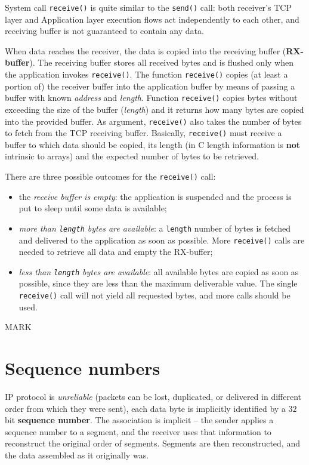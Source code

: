\documentclass[10pt]{book}
\begin{document}
System call \texttt{receive()} is quite similar to the \texttt{send()} call:
both receiver's TCP layer and Application layer execution flows act
independently to each other, and receiving buffer is not guaranteed to contain
any data.

When data reaches the receiver, the data is copied into the receiving buffer
(\textbf{RX-buffer}). The receiving buffer stores all received bytes and is flushed only
when the application invokes \texttt{receive()}. The function
\texttt{receive()} copies (at least a portion of) the receiver buffer into the
application buffer by means of passing a buffer with known \emph{address} and
\emph{length}. Function \texttt{receive()} copies bytes without exceeding the size of
the buffer (\emph{length}) and it returns how many bytes are copied into the
provided buffer. As argument, \texttt{receive()} also takes the number of bytes
to fetch from the TCP receiving buffer. Basically, \texttt{receive()} must
receive a buffer to which data should be copied, its length (in C length
information is \textbf{not} intrinsic to arrays) and the expected number of
bytes to be retrieved.

There are three possible outcomes for the \texttt{receive()} call:

\begin{itemize}
    \item the \emph{receive buffer is empty}: the application is suspended and
		the process is put to sleep until some data is available;
    \item \emph{more than \texttt{length} bytes are available}: a
        \texttt{length} number of bytes is fetched and delivered to the
        application as soon as possible. More \texttt{receive()} calls are
        needed to retrieve all data and empty the RX-buffer;
    \item \emph{less than \texttt{length} bytes are available}: all available
        bytes are copied as soon as possible, since they are less than the
        maximum deliverable value. The single \texttt{receive()} call will not
        yield all requested bytes, and more calls should be used.
\end{itemize}

MARK
\section{Sequence numbers}

IP protocol is \emph{unreliable} (packets can be lost, duplicated, or delivered
in different order from which they were sent), each data byte is implicitly
identified by a $32$ bit \textbf{sequence number}. The association is implicit
\--- the sender applies a sequence number to a segment, and the receiver uses
that information to reconstruct the original order of segments. Segments are
then reconstructed, and the data assembled as it originally was.
\end{document}
